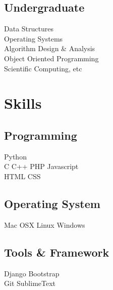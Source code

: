 \documentclass[]{deedy-resume-openfont}
\begin{document}
\begin{minipage}[t]{0.33\textwidth}


\subsection{Undergraduate}
Data Structures \\
Operating Systems \\
Algorithm Design \& Analysis \\
Object Oriented Programming \\
Scientific Computing, etc \\
\sectionsep


\section{Skills}
\subsection{Programming}
Python \\
C \textbullet{} C++ \textbullet{} PHP \textbullet{} Javascript \\ HTML \textbullet{} CSS \textbullet{} \\
\subsection{Operating System}
Mac OSX \textbullet{} Linux \textbullet{} Windows
\subsection{Tools \& Framework}
Django \textbullet{} Bootstrap \\
Git \textbullet SublimeText
\sectionsep


\end{minipage}
\end{document}
